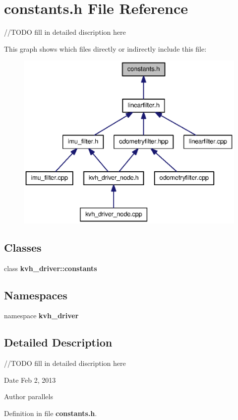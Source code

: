 \section{constants.\-h \-File \-Reference}
\label{constants_8h}


//\-T\-O\-D\-O fill in detailed discription here  


\-This graph shows which files directly or indirectly include this file\-:
\nopagebreak
\begin{figure}[H]
\begin{center}
\leavevmode
\includegraphics[width=344pt]{constants_8h__dep__incl}
\end{center}
\end{figure}
\subsection*{\-Classes}
\begin{DoxyCompactItemize}
\item 
class {\bf kvh\-\_\-driver\-::constants}
\end{DoxyCompactItemize}
\subsection*{\-Namespaces}
\begin{DoxyCompactItemize}
\item 
namespace {\bf kvh\-\_\-driver}
\end{DoxyCompactItemize}


\subsection{\-Detailed \-Description}
//\-T\-O\-D\-O fill in detailed discription here \begin{DoxyDate}{\-Date}
\-Feb 2, 2013 
\end{DoxyDate}
\begin{DoxyAuthor}{\-Author}
parallels 
\end{DoxyAuthor}


\-Definition in file {\bf constants.\-h}.

